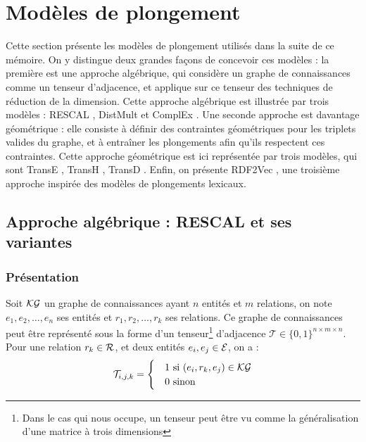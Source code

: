 \section{Modèles de plongement}
\label{sec:kge-models}

Cette section présente les modèles de plongement utilisés dans la suite de ce mémoire. On y distingue deux grandes façons de concevoir ces modèles : la première est une approche algébrique, qui considère un graphe de connaissances comme un tenseur d'adjacence, et applique sur ce tenseur des techniques de réduction de la dimension. %
Cette approche algébrique est illustrée par trois modèles : RESCAL \cite{rescal}, DistMult \cite{distmult} et ComplEx \cite{complex}. Une seconde approche est davantage géométrique : elle consiste à définir des contraintes géométriques pour les triplets valides du graphe, et à entraîner les plongements afin qu'ils respectent ces contraintes. %
Cette approche géométrique est ici représentée par trois modèles, qui sont TransE \cite{bordes2013translating}, TransH \cite{transh}, TransD \cite{transd}. 
Enfin, on présente RDF2Vec \cite{ristoski2016rdf2vec}, une troisième approche inspirée des modèles de plongements lexicaux.


\subsection{Approche algébrique : RESCAL et ses variantes}
\label{subsec:kge-models-mult}

\subsubsection{Présentation}


Soit $\mathcal{KG}$ un graphe de connaissances ayant $n$ entités et $m$ relations, on note $e_1, e_2, \ldots, e_n$ ses entités et $r_1, r_2, \ldots, r_k$ ses relations. Ce graphe de connaissances peut être représenté sous la forme d'un tenseur\footnote{Dans le cas qui nous occupe, un tenseur peut être vu comme la généralisation d'une matrice à trois dimensions} d'adjacence $\mathcal{T} \in \{0, 1\}^{n \times m \times n}$. Pour une relation $r_k \in \mathcal{R}$, et deux entités $e_i, e_j \in \mathcal{E}$, on a :
\begin{equation}
    \mathcal{T}_{i, j, k} = \begin{cases}
    &1 \text{ si } (e_i, r_k, e_j) \in \mathcal{KG} \\
    &0 \text{ sinon}
    \end{cases}
\end{equation}

